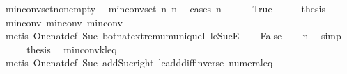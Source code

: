 \begin{isabellebody}
\endisatagproof
{\isafoldproof}%
%
\isadelimproof
\isanewline
%
\endisadelimproof
\isanewline
{}\isamarkupfalse%
\ min{\isacharunderscore}{\kern0pt}conv{\isacharunderscore}{\kern0pt}set{\isacharunderscore}{\kern0pt}non{\isacharunderscore}{\kern0pt}empty{\isacharcolon}{\kern0pt}\isanewline
\ \ {\isachardoublequoteopen}min{\isacharunderscore}{\kern0pt}conv{\isacharunderscore}{\kern0pt}set\ n\ n\ {\isasymnoteq}\ {\isacharbraceleft}{\kern0pt}{\isacharbraceright}{\kern0pt}{\isachardoublequoteclose}\isanewline
%
\isadelimproof
%
\endisadelimproof
%
\isatagproof
{}\isamarkupfalse%
{\isacharparenleft}{\kern0pt}cases\ {\isachardoublequoteopen}n\ {\isasymle}\ {}{\isachardoublequoteclose}{\isacharparenright}{\kern0pt}\isanewline
\ \ \isamarkupfalse%
\ True\isanewline
\ \ \isamarkupfalse%
\ \isamarkupfalse%
\ {\isacharquery}{\kern0pt}thesis\ \isamarkupfalse%
\ min{\isacharunderscore}{\kern0pt}conv{\isacharunderscore}{\kern0pt}{}\ min{\isacharunderscore}{\kern0pt}conv{\isacharunderscore}{\kern0pt}{}\ min{\isacharunderscore}{\kern0pt}conv{\isacharunderscore}{\kern0pt}{}\isanewline
\ \ \ \ \isamarkupfalse%
\ {\isacharparenleft}{\kern0pt}metis\ One{\isacharunderscore}{\kern0pt}nat{\isacharunderscore}{\kern0pt}def\ Suc{\isacharunderscore}{\kern0pt}{}\ bot{\isacharunderscore}{\kern0pt}nat{\isacharunderscore}{\kern0pt}{}{\isachardot}{\kern0pt}extremum{\isacharunderscore}{\kern0pt}uniqueI\ le{\isacharunderscore}{\kern0pt}SucE{\isacharparenright}{\kern0pt}\isanewline
{}\isamarkupfalse%
\isanewline
\ \ \isamarkupfalse%
\ False\isanewline
\ \ \isamarkupfalse%
\ {\isachardoublequoteopen}n{\isasymge}{}{\isachardoublequoteclose}\ \isamarkupfalse%
\ simp\isanewline
\ \ \isamarkupfalse%
\ \isamarkupfalse%
\ {\isacharquery}{\kern0pt}thesis\ \isamarkupfalse%
\ min{\isacharunderscore}{\kern0pt}conv{\isacharunderscore}{\kern0pt}k{\isacharunderscore}{\kern0pt}l{\isacharunderscore}{\kern0pt}eq\isanewline
\ \ \ \ \isamarkupfalse%
\ {\isacharparenleft}{\kern0pt}metis\ One{\isacharunderscore}{\kern0pt}nat{\isacharunderscore}{\kern0pt}def\ Suc{\isacharunderscore}{\kern0pt}{}\ add{\isacharunderscore}{\kern0pt}Suc{\isacharunderscore}{\kern0pt}right\ le{\isacharunderscore}{\kern0pt}add{\isacharunderscore}{\kern0pt}diff{\isacharunderscore}{\kern0pt}inverse{}\ numeral{\isacharunderscore}{\kern0pt}{}{\isacharunderscore}{\kern0pt}eq{\isacharunderscore}{\kern0pt}{}{\isacharparenright}{\kern0pt}\isanewline

\end{isabellebody}
